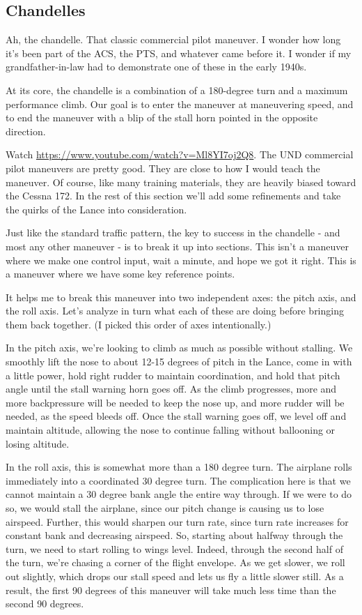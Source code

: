 \subsection{Chandelles}

Ah, the chandelle. That classic commercial pilot maneuver. I wonder how long it's been part of the ACS, the PTS, and whatever came before it. I wonder if my grandfather-in-law had to demonstrate one of these in the early 1940s.

At its core, the chandelle is a combination of a 180-degree turn and a maximum performance climb. Our goal is to enter the maneuver at maneuvering speed, and to end the maneuver with a blip of the stall horn pointed in the opposite direction.

Watch \url{https://www.youtube.com/watch?v=Ml8YI7oj2Q8}. The UND commercial pilot maneuvers are pretty good. They are close to how I would teach the maneuver. Of course, like many training materials, they are heavily biased toward the Cessna 172. In the rest of this section we'll add some refinements and take the quirks of the Lance into consideration.

Just like the standard traffic pattern, the key to success in the chandelle - and most any other maneuver - is to break it up into sections. This isn't a maneuver where we make one control input, wait a minute, and hope we got it right. This is a maneuver where we have some key reference points.

It helps me to break this maneuver into two independent axes: the pitch axis, and the roll axis. Let's analyze in turn what each of these are doing before bringing them back together. (I picked this order of axes intentionally.)

In the pitch axis, we're looking to climb as much as possible without stalling. We smoothly lift the nose to about 12-15 degrees of pitch in the Lance, come in with a little power, hold right rudder to maintain coordination, and hold that pitch angle until the stall warning horn goes off. As the climb progresses, more and more backpressure will be needed to keep the nose up, and more rudder will be needed, as the speed bleeds off. Once the stall warning goes off, we level off and maintain altitude, allowing the nose to continue falling without ballooning or losing altitude.

In the roll axis, this is somewhat more than a 180 degree turn. The airplane rolls immediately into a coordinated 30 degree turn. The complication here is that we cannot maintain a 30 degree bank angle the entire way through. If we were to do so, we would stall the airplane, since our pitch change is causing us to lose airspeed. Further, this would sharpen our turn rate, since turn rate increases for constant bank and decreasing airspeed. So, starting about halfway through the turn, we need to start rolling to wings level. Indeed, through the second half of the turn, we're chasing a corner of the flight envelope. As we get slower, we roll out slightly, which drops our stall speed and lets us fly a little slower still. As a result, the first 90 degrees of this maneuver will take much less time than the second 90 degrees.

